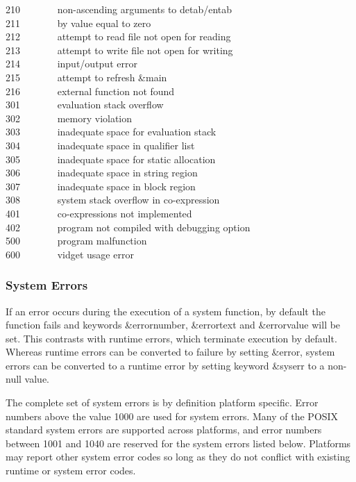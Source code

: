 210 \ \ \ \ \ \ \ non-ascending arguments to detab/entab\\
211 \ \ \ \ \ \ \ by value equal to zero\\
212 \ \ \ \ \ \ \ attempt to read file not open for reading\\
213 \ \ \ \ \ \ \ attempt to write file not open for writing\\
214 \ \ \ \ \ \ \ input/output error\\
215 \ \ \ \ \ \ \ attempt to refresh \&main\\
216 \ \ \ \ \ \ \ external function not found\\
301 \ \ \ \ \ \ \ evaluation stack overflow\\
302 \ \ \ \ \ \ \ memory violation\\
303 \ \ \ \ \ \ \ inadequate space for evaluation stack\\
304 \ \ \ \ \ \ \ inadequate space in qualifier list\\
305 \ \ \ \ \ \ \ inadequate space for static allocation\\
306 \ \ \ \ \ \ \ inadequate space in string region\\
307 \ \ \ \ \ \ \ inadequate space in block region\\
308 \ \ \ \ \ \ \ system stack overflow in co-expression\\
401 \ \ \ \ \ \ \ co-expressions not implemented\\
402 \ \ \ \ \ \ \ program not compiled with debugging option\\
500 \ \ \ \ \ \ \ program malfunction\\
600 \ \ \ \ \ \ \ vidget usage error

\subsubsection{System Errors}
If an error occurs during the execution of a system
function, by default the function fails and keywords \&errornumber,
\&errortext and \&errorvalue will be set. This contrasts with runtime
errors, which terminate execution by default. Whereas runtime errors
can be converted to failure by setting \&error, system errors can be
converted to a runtime error by setting keyword \&syserr to a non-null
value.

The complete set of system errors is by definition
platform specific. Error numbers above the value 1000 are used for
system errors. Many of the POSIX standard system errors are supported
across platforms, and error numbers between 1001 and 1040 are reserved
for the system errors listed below. Platforms may report other system
error codes so long as they do not conflict with existing runtime or
system error codes.

